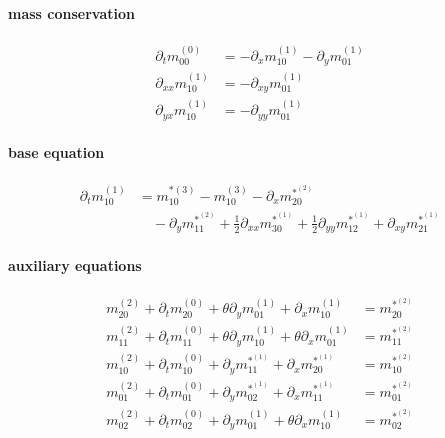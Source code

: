 \documentclass{article}
\begin{document}
  \paragraph{mass conservation}
  \begin{align}
    \partial_t m_{00}^{(0)}  & =  - \partial_x m_{10}^{(1)} - \partial_y m_{01}^{(1)}\tag{M1} \\
    \partial_{xx} m_{10}^{(1)}  & = - \partial_{xy} m_{01}^{(1)} \tag{M2}\\
    \partial_{yx} m_{10}^{(1)}  & = - \partial_{yy} m_{01}^{(1)} \tag{M3}
  \end{align}

  \paragraph{base equation}
  \begin{equation}
    \tag{B1}
    \begin{aligned}
       \partial_t m_{10}^{(1)} & =
      m_{10}^{*(3)} - m_{10}^{(3)} - \partial_x m_{20}^{*^{(2)}} \\
      &\quad - \partial_y m_{11}^{*^{(2)}} + \frac{1}{2}\partial_{xx} m_{30}^{*^{(1)}} + \frac{1}{2} \partial_{yy} m_{12}^{*^{(1)}} + \partial_{xy} m_{21}^{*^{(1)}}
    \end{aligned}
  \end{equation}

  \paragraph{auxiliary equations}
  \begin{align}
    m_{20}^{(2)} + \partial_t m_{20}^{(0)} + \theta\partial_y m_{01}^{(1)} + \partial_x m_{10}^{(1)} &= m_{20}^{*^{(2)}} \tag{A1} \\
    m_{11}^{(2)} + \partial_t m_{11}^{(0)} + \theta\partial_y m_{10}^{(1)} + \theta\partial_x m_{01}^{(1)} &= m_{11}^{*^{(2)}} \tag{A2} \\
    m_{10}^{(2)} + \partial_t m_{10}^{(0)} + \partial_y m_{11}^{*^{(1)}} + \partial_x m_{20}^{*^{(1)}} &= m_{10}^{*^{(2)}} \tag{A3} \\
    m_{01}^{(2)} + \partial_t m_{01}^{(0)} + \partial_y m_{02}^{*^{(1)}} + \partial_x m_{11}^{*^{(1)}} &= m_{01}^{*^{(2)}} \tag{A4} \\
    m_{02}^{(2)} + \partial_t m_{02}^{(0)} + \partial_y m_{01}^{(1)} + \theta\partial_x m_{10}^{(1)} &= m_{02}^{*^{(2)}} \tag{A5}
  \end{align}
\end{document}
